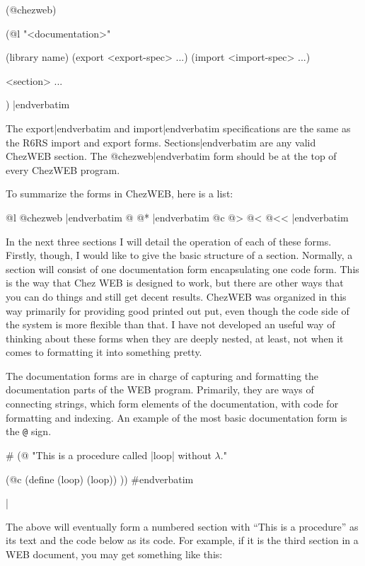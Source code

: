 \medskip\verbatim
(@chezweb)

(@l "<documentation>"

(library name)
(export <export-spec> ...)
(import <import-spec> ...)

<section> ...

)
|endverbatim
\medskip

\noindent
The 
\verbatim export|endverbatim 
and 
\verbatim import|endverbatim 
specifications are the same as the R6RS import and
export forms.  
\verbatim Sections|endverbatim 
are any valid ChezWEB
section.  The 
\verbatim @chezweb|endverbatim 
form should be at the top
of every ChezWEB program.

To summarize the forms in ChezWEB, here is a list:

\medskip
{}
\verbatim @l @chezweb |endverbatim
\verbatim @ @* |endverbatim
\verbatim @c @> @< @<< |endverbatim
\medskip

\noindent
In the next three sections I will detail the operation of each of
these forms.  Firstly, though, I would like to give the basic
structure of a section.  Normally, a section will consist of one
documentation form encapsulating one code form.  This is the way that
Chez WEB is designed to work, but there are other ways that you can do
things and still get decent results.  ChezWEB was organized in this
way primarily for providing good printed out put, even though the code
side of the system is more flexible than that.  I have not developed
an useful way of thinking about these forms when they are deeply
nested, at least, not when it comes to formatting it into something
pretty.

%
The documentation forms are in charge of capturing and formatting the
documentation parts of the WEB program.  Primarily, they are ways of
connecting strings, which form elements of the documentation, with
code for formatting and indexing.  An example of the most basic
documentation form is the {\tt @} sign.

\verbatimescapechar \#
\medskip\verbatim
(@
"This is a procedure called |loop|
without $\lambda$."

(@c
(define (loop) (loop))
))
#endverbatim
\medskip

\verbatimescapechar |

\noindent
The above will eventually form a numbered section with ``This is a
procedure'' as its text and the code below as its code.  For example,
if it is the third section in a WEB document, you may get something
like this:

